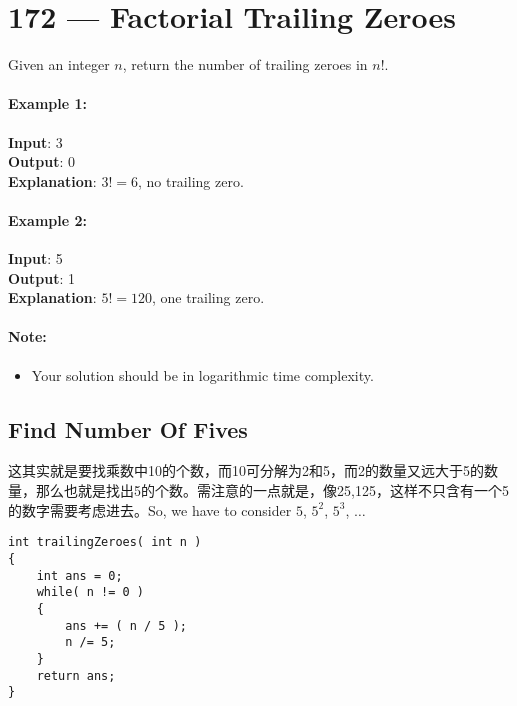 \section{172 --- Factorial Trailing Zeroes}
Given an integer $n$, return the number of trailing zeroes in $n!$.
\paragraph{Example 1:}
\begin{flushleft}
\textbf{Input}: 3
\\
\textbf{Output}: 0
\\
\textbf{Explanation}: $3! = 6$, no trailing zero.
\end{flushleft}
\paragraph{Example 2:}
\begin{flushleft}
\textbf{Input}: 5
\\
\textbf{Output}: 1
\\
\textbf{Explanation}: $5! = 120$, one trailing zero.
\end{flushleft}
\paragraph{Note:}
\begin{itemize}
\item Your solution should be in logarithmic time complexity.
\end{itemize}
\subsection{Find Number Of Fives}

这其实就是要找乘数中10的个数，而10可分解为2和5，而2的数量又远大于5的数量，那么也就是找出5的个数。需注意的一点就是，像25,125，这样不只含有一个5的数字需要考虑进去。So, we have to consider $5$, $5^2$, $5^3$, $\ldots$

\setcounter{lstlisting}{0}
\begin{lstlisting}[style=customc, caption={Count Fives}]
int trailingZeroes( int n )
{
    int ans = 0;
    while( n != 0 )
    {
        ans += ( n / 5 );
        n /= 5;
    }
    return ans;
}
\end{lstlisting}